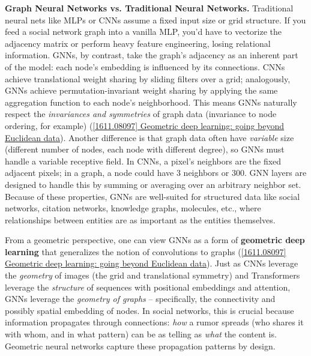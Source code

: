 \documentclass[12pt,a4paper]{report}
\begin{document}
\textbf{Graph Neural Networks vs. Traditional Neural Networks.} Traditional neural nets like MLPs or CNNs assume a fixed input size or grid structure. If you feed a social network graph into a vanilla MLP, you’d have to vectorize the adjacency matrix or perform heavy feature engineering, losing relational information. GNNs, by contrast, take the graph’s adjacency as an inherent part of the model: each node’s embedding is influenced by its connections. CNNs achieve translational weight sharing by sliding filters over a grid; analogously, GNNs achieve permutation-invariant weight sharing by applying the same aggregation function to each node’s neighborhood. This means GNNs naturally respect the \textit{invariances and symmetries} of graph data (invariance to node ordering, for example) (\href{https://arxiv.org/abs/1611.08097#:~:text=Euclidean%20or%20grid,directions%20in%20this%20nascent%20field}{[1611.08097] Geometric deep learning: going beyond Euclidean data}). Another difference is that graph data often have \textit{variable} size (different number of nodes, each node with different degree), so GNNs must handle a variable receptive field. In CNNs, a pixel’s neighbors are the fixed adjacent pixels; in a graph, a node could have 3 neighbors or 300. GNN layers are designed to handle this by summing or averaging over an arbitrary neighbor set. Because of these properties, GNNs are well-suited for structured data like social networks, citation networks, knowledge graphs, molecules, etc., where relationships between entities are as important as the entities themselves.

From a geometric perspective, one can view GNNs as a form of \textbf{geometric deep learning} that generalizes the notion of convolutions to graphs (\href{https://arxiv.org/abs/1611.08097#:~:text=Euclidean%20or%20grid,directions%20in%20this%20nascent%20field}{[1611.08097] Geometric deep learning: going beyond Euclidean data}). Just as CNNs leverage the \textit{geometry} of images (the grid and translational symmetry) and Transformers leverage the \textit{structure} of sequences with positional embeddings and attention, GNNs leverage the \textit{geometry of graphs} – specifically, the connectivity and possibly spatial embedding of nodes. In social networks, this is crucial because information propagates through connections: \textit{how} a rumor spreads (who shares it with whom, and in what pattern) can be as telling as \textit{what} the content is. Geometric neural networks capture these propagation patterns by design.
\end{document}
